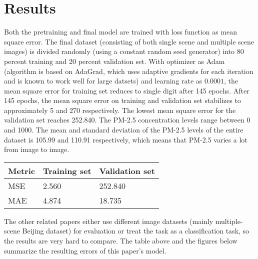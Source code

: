 \documentclass{article}
\begin{document}
\section{Results}
Both the pretraining and final model are trained with loss function as mean square error. The final dataset (consisting of both single scene and multiple scene images) is divided randomly (using a constant random seed generator) into 80 percent training and 20 percent validation set. With optimizer as Adam (algorithm is based on AdaGrad, which uses adaptive gradients for each iteration and is known to work well for large datsets) and learning rate as $0.0001$, the mean square error for training set reduces to single digit after 145 epochs. After 145 epochs, the mean square error on training and validation set stabilizes to approximately 5 and 270 respectively. The lowest mean square error for the validation set reaches 252.840. The PM-2.5 concentration levels range between 0 and 1000. The mean and standard deviation of the PM-2.5 levels of the entire dataset is 105.99 and 110.91 respectively, which means that PM-2.5 varies a lot from image to image.
\begin{table}[H]
\centering
\begin{tabular}{|l|l|l|}
\hline
 Metric & Training set & Validation set\\ \hline
 MSE & 2.560 & 252.840 \\ \hline
 MAE & 4.874 & 18.735  \\ \hline
\end{tabular}
\end{table}
The other related papers either use different image datasets (mainly multiple-scene Beijing dataset) for evaluation or treat the task as a classification task, so the results are very hard to compare. The table above and the figures below summarize the resulting errors of this paper's model.
\end{document}
